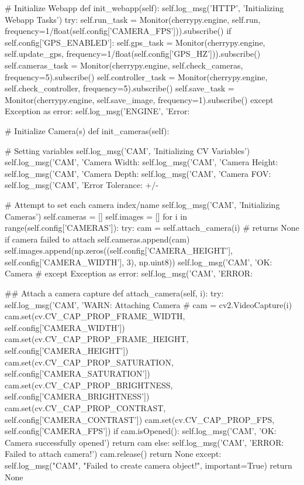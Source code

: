 \begin{python}
    # Initialize Webapp
    def init_webapp(self):
        self.log_msg('HTTP', 'Initializing Webapp Tasks')
        try:
            self.run_task = Monitor(cherrypy.engine, self.run, frequency=1/float(self.config['CAMERA_FPS'])).subscribe()
            if self.config['GPS_ENABLED']: self.gps_task = Monitor(cherrypy.engine, self.update_gps, frequency=1/float(self.config['GPS_HZ'])).subscribe()
            self.cameras_task = Monitor(cherrypy.engine, self.check_cameras, frequency=5).subscribe()
            self.controller_task = Monitor(cherrypy.engine, self.check_controller, frequency=5).subscribe()
            self.save_task =  Monitor(cherrypy.engine, self.save_image, frequency=1).subscribe()
        except Exception as error:
            self.log_msg('ENGINE', 'Error: %

    # Initialize Camera(s)
    def init_cameras(self):
        
        # Setting variables
        self.log_msg('CAM', 'Initializing CV Variables')
        self.log_msg('CAM', 'Camera Width: %
        self.log_msg('CAM', 'Camera Height: %
        self.log_msg('CAM', 'Camera Depth: %
        self.log_msg('CAM', 'Camera FOV: %
        self.log_msg('CAM', 'Error Tolerance: +/- %
        
        # Attempt to set each camera index/name
        self.log_msg('CAM', 'Initializing Cameras')
        self.cameras = []
        self.images = []
        for i in range(self.config['CAMERAS']):
            try:
                cam = self.attach_camera(i) # returns None if camera failed to attach
                self.cameras.append(cam)
                self.images.append(np.zeros((self.config['CAMERA_HEIGHT'], self.config['CAMERA_WIDTH'], 3), np.uint8))
                self.log_msg('CAM', 'OK: Camera #%
            except Exception as error:
                self.log_msg('CAM', 'ERROR: %

    ## Attach a camera capture
    def attach_camera(self, i):
        try:
            self.log_msg('CAM', 'WARN: Attaching Camera #%
            cam = cv2.VideoCapture(i)
            cam.set(cv.CV_CAP_PROP_FRAME_WIDTH, self.config['CAMERA_WIDTH'])
            cam.set(cv.CV_CAP_PROP_FRAME_HEIGHT, self.config['CAMERA_HEIGHT'])
            cam.set(cv.CV_CAP_PROP_SATURATION, self.config['CAMERA_SATURATION'])
            cam.set(cv.CV_CAP_PROP_BRIGHTNESS, self.config['CAMERA_BRIGHTNESS'])
            cam.set(cv.CV_CAP_PROP_CONTRAST, self.config['CAMERA_CONTRAST'])
            cam.set(cv.CV_CAP_PROP_FPS, self.config['CAMERA_FPS'])
            if cam.isOpened():
                self.log_msg('CAM', 'OK: Camera successfully opened')
                return cam
            else:
                self.log_msg('CAM', 'ERROR: Failed to attach camera!')
                cam.release()
                return None
        except:
            self.log_msg("CAM", "Failed to create camera object!", important=True)
            return None


\end{python}
